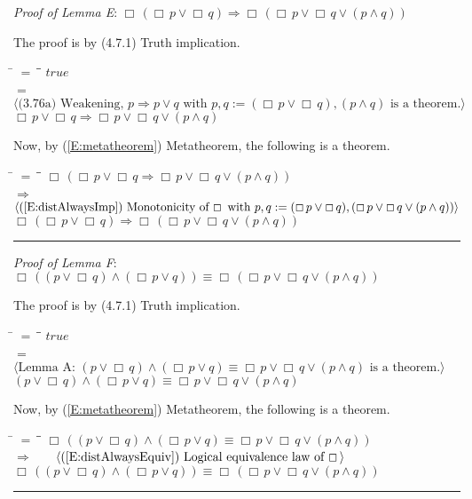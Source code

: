 \documentclass[12pt, fleqn, leqno]{article}
\newcommand{\lgap}{2pt}                             %
\newcommand{\mymathindent}{24pt}                    %
\newcommand{\impl}{\ensuremath{\Rightarrow}}        %
\newcommand{\Always}{\Box\,}
\newcommand{\myqed}{\rule[-.23ex]{1.2ex}{2.0ex}}
\newcommand{\myqedtab}{\hspace{384pt}}              %
\newcommand{\Gll} {\langle}                         %
\newcommand{\Ggg} {\rangle}                         %
\newcommand{\Hint}[1]     {\ \ \ $\Gll              \mbox{#1} \Ggg$ }   %
\begin{document}
\emph{Proof of Lemma E}:
$\Always (\Always p \lor \Always q) \impl \Always (\Always p \lor \Always q \lor (p \land q))$

The proof is by (4.7.1) Truth implication.
\begin{tabbing}
\hspace{\mymathindent} \= $= \;$ \= \myqedtab \= \kill
  \> \>   $true$\\[\lgap]
  \> $=$ \> \Hint{(3.76a) Weakening, $p\impl p\lor q$ with $p,q := (\Always p \lor \Always q), (p \land q)$ is a theorem.} \\[\lgap]
\> \> $\Always p \lor \Always q \impl \Always p \lor \Always q \lor (p \land q)$
\end{tabbing}
Now, by (\ref{E:metatheorem}) Metatheorem, the following is a theorem.
\begin{tabbing}
\hspace{\mymathindent} \= $= \;$ \= \myqedtab \= \kill
  \> \>   $\Always (\Always p \lor \Always q \impl \Always p \lor \Always q \lor (p \land q))$\\[\lgap]
  \> $\impl$  \>  \Hint{(\ref{E:distAlwaysImp}) Monotonicity of $\Always$ with $p, q := ( \Always p \lor \Always q), (\Always p \lor \Always q \lor (p \land q)) $}\\[\lgap]
  \> \>   $\Always (\Always p \lor \Always q) \impl \Always (\Always p \lor \Always q \lor (p \land q))$ \quad \myqed
\end{tabbing}

\emph{Proof of Lemma F}:
$\Always ((p \lor \Always q) \land (\Always p \lor q)) \equiv \Always (\Always p \lor \Always q \lor (p \land q))$

The proof is by (4.7.1) Truth implication.
\begin{tabbing}
\hspace{\mymathindent} \= $= \;$ \= \myqedtab \= \kill
\> \>   $true$\\[\lgap]
 \> $=$  \>  \Hint{Lemma A: $(p \lor \Always q) \land (\Always p \lor q) \equiv \Always p \lor \Always q \lor (p \land q)$ is a theorem.}\\[\lgap]
 \>\>	$(p \lor \Always q) \land (\Always p \lor q) \equiv \Always p \lor \Always q \lor (p \land q)$
\end{tabbing}
Now, by (\ref{E:metatheorem}) Metatheorem, the following is a theorem.
\begin{tabbing}
\hspace{\mymathindent} \= $= \;$ \= \myqedtab \= \kill
  \>\>	$\Always ((p \lor \Always q) \land (\Always p \lor q) \equiv \Always p \lor \Always q \lor (p \land q))$\\[\lgap]
  \> $\impl$  \>  \Hint{(\ref{E:distAlwaysEquiv}) Logical equivalence law of $\Always$}\\[\lgap]
  \>\>	$\Always ((p \lor \Always q) \land (\Always p \lor q)) \equiv \Always (\Always p \lor \Always q \lor (p \land q))$ \quad \myqed
\end{tabbing}
\end{document}

